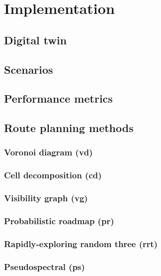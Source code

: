 \chapter{Implementation} \label{ch:implementation}

\section{Digital twin}

\section{Scenarios}

\section{Performance metrics}


\section{Route planning methods}

\subsection{Voronoi diagram (\gls{vd})}
\subsection{Cell decomposition (\gls{cd})}
\subsection{Visibility graph (\gls{vg})}
\subsection{Probabilistic roadmap (\gls{pr})}
\subsection{Rapidly-exploring random three (\gls{rrt})}
\subsection{Pseudospectral (\gls{ps})}
